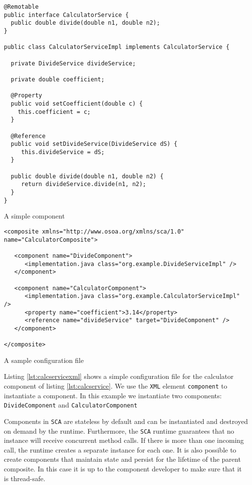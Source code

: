 \begin{listing}
\begin{verbatim}
@Remotable
public interface CalculatorService {
  public double divide(double n1, double n2);
}

public class CalculatorServiceImpl implements CalculatorService {

  private DivideService divideService;
  
  private double coefficient;
  
  @Property
  public void setCoefficient(double c) {
    this.coefficient = c;
  }

  @Reference
  public void setDivideService(DivideService dS) {
     this.divideService = dS;
  }

  public double divide(double n1, double n2) {
     return divideService.divide(n1, n2);
  }
}
\end{verbatim}
\caption{A simple component}
\label{lst:calcservice}
\end{listing}
\begin{listing}
\begin{verbatim}
<composite xmlns="http://www.osoa.org/xmlns/sca/1.0" name="CalculatorComposite">

   <component name="DivideComponent">
      <implementation.java class="org.example.DivideServiceImpl" />
   </component>

   <component name="CalculatorComponent">
      <implementation.java class="org.example.CalculatorServiceImpl" />
      <property name="coefficient">3.14</property>
      <reference name="divideService" target="DivideComponent" />
   </component>

</composite>
\end{verbatim}
\caption{A sample configuration file}
\label{lst:calcservicexml}
\end{listing}

Listing \ref{lst:calcservicexml} shows a simple configuration file for the calculator component of listing \ref{lst:calcservice}.
We use the \texttt{XML} element \texttt{component} to instantiate a component. In this example we instantiate two components:
\texttt{DivideComponent} and \texttt{CalculatorComponent}

Components in \texttt{SCA} are stateless by default and can be instantiated and destroyed on demand by the runtime. Furthermore, the
\texttt{SCA} runtime guarantees that no instance will receive concurrent method calls. If there is more than one incoming call, the
runtime creates a separate instance for each one. It is also possible to create components that maintain state and persist
for the lifetime of the parent composite. In this case it is up to the component developer to make sure that it is thread-safe.


